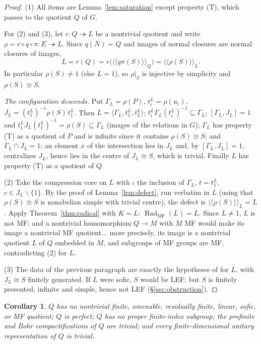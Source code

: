 \documentclass[11pt]{amsart}
\newtheorem{corollary}[theorem]{Corollary}
\theoremstyle{remark}
\theoremstyle{definition}
\newcommand{\RadMF}{\operatorname{Rad}_{\mathrm{MF}}}
\newcommand{\ncl}[1]{\langle\!\langle #1\rangle\!\rangle}
\begin{document}
\begin{proof}
(1) All items are Lemma~\ref{lem:saturation} except property \textup{(T)},
which passes to the quotient $Q$ of $G$.

For (2) and (3), let $r\colon Q\twoheadrightarrow L$ be a nontrivial
quotient and write $\rho=r\circ q\circ\pi\colon E\twoheadrightarrow L$.
Since $q(N)=Q$ and images of normal closures are normal closures of images,
\[
L=r(Q)=r\bigl(\ncl{q\pi(S)}_Q\bigr)=\ncl{\rho(S)}_L .
\]
In particular $\rho(S)\neq1$ (else $L=1$), so $\rho|_S$ is injective by
simplicity and $\rho(S)\cong S$.

\emph{The configuration descends.}  Put $\Gamma_L=\rho(P)$,
$t_i^L=\rho(u_i)$, $J_L=(t_1^L)^{-1}\rho(S)\,t_1^L$.  Then
$L=\langle\Gamma_L,t_1^L,t_2^L\rangle$;
$t_i^L\Gamma_L(t_i^L)^{-1}\subseteq\Gamma_L$; $[\Gamma_L,J_L]=1$ and
$t_1^LJ_L(t_1^L)^{-1}=\rho(S)\subseteq\Gamma_L$ (images of the relations in
$G$); $\Gamma_L$ has property \textup{(T)} as a quotient of $P$ and is
infinite since it contains $\rho(S)\cong S$; and $\Gamma_L\cap J_L=1$:
an element $x$ of the intersection lies in $J_L$ and, by
$[\Gamma_L,J_L]=1$, centralizes $J_L$, hence lies in the centre of
$J_L\cong S$, which is trivial.  Finally $L$ has property \textup{(T)} as a
quotient of $Q$.

(2) Take the compression core on $L$ with $\iota$ the inclusion of
$\Gamma_L$, $t=t_1^L$, $c\in J_L\smallsetminus\{1\}$.  By the proof of
Lemma~\ref{lem:defect}, run verbatim in $L$ (using that $\rho(S)\cong S$ is
nonabelian simple with trivial centre), the defect is
$\ncl{\rho(S)}_L=L$.  Apply Theorem~\ref{thm:radical} with $K=L$:
$\RadMF(L)=L$.  Since $L\neq1$, $L$ is not MF; and a nontrivial
homomorphism $Q\to M$ with $M$ MF would make its image a nontrivial MF
quotient... more precisely, its image is a nontrivial quotient $L$ of $Q$
embedded in $M$, and subgroups of MF groups are MF, contradicting (2) for
$L$.

(3) The data of the previous paragraph are exactly the hypotheses of
\cite[Proposition~1.2]{FFF} for $L$, with $J_L\cong S$ finitely generated.
If $L$ were sofic, $S$ would be LEF; but $S$ is finitely presented, infinite
and simple, hence not LEF (\S\ref{sec:obstruction}).
\end{proof}

\begin{corollary}\label{cor:consequences}
$Q$ has no nontrivial finite, amenable, residually finite, linear, sofic, or
MF quotient; $Q$ is perfect; $Q$ has no proper finite-index subgroup; the
profinite and Bohr compactifications of $Q$ are trivial; and every
finite-dimensional unitary representation of $Q$ is trivial.
\end{corollary}
\end{document}
